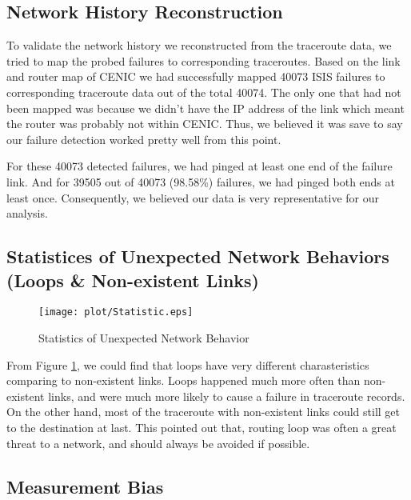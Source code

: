 \documentclass[conference, twocolumn, oneside, 10pt]{IEEEtran}
\begin{document}
\subsection{Network History Reconstruction}

To validate the network history we reconstructed from the traceroute data, we tried to map the probed failures to corresponding traceroutes. Based on the link and router map of CENIC we had successfully mapped 40073 ISIS failures to corresponding traceroute data out of the total 40074. The only one that had not been mapped was because we didn't have the IP address of the link which meant the router was probably not within CENIC. Thus, we believed it was save to say our failure detection worked pretty well from this point.

For these 40073 detected failures, we had pinged at least one end of the failure link. And for 39505 out of 40073 (98.58\%) failures, we had pinged both ends at least once. Consequently, we believed our data is very representative for our analysis.

\subsection{Statistices of Unexpected Network Behaviors (Loops \& Non-existent Links)}

\begin{figure}[h!]
\centering
\texttt{[image: plot/Statistic.eps]}
\caption{Statistics of Unexpected Network Behavior}
\label{fig:statistics}
\end{figure}

From Figure \ref{fig:statistics}, we could find that loops have very different charasteristics comparing to non-existent links. Loops happened much more often than non-existent links, and were much more likely to cause a failure in traceroute records. On the other hand, most of the traceroute with non-existent links could still get to the destination at last. This pointed out that, routing loop was often a great threat to a network, and should always be avoided if possible.

\subsection{Measurement Bias}
\end{document}
